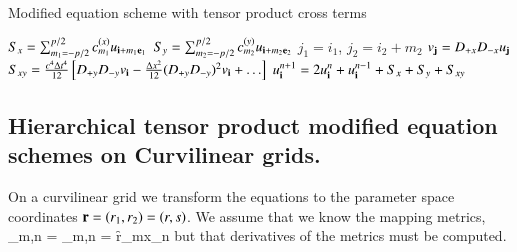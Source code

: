 \begin{algorithm}[H]
\algFontSize 
\caption{Modified equation scheme with tensor product cross terms}
\begin{algorithmic}[1]
        \State $S_x = \sum_{m_1=-p/2}^{p/2} c_{m_1}^{(x)} u_{\mathbf{ i}+m_1\mathbf{ e}_1}$  
        \State $S_y = \sum_{m_2=-p/2}^{p/2} c_{m_2}^{(y)} u_{\mathbf{ i}+m_2\mathbf{ e}_2}$  
          
          \State $j_1=i_1$, $j_2=i_2+m_2$
          \State $v_{\mathbf{ j}} = D_{+x}D_{-x} u_{\mathbf{ j}}$ 
        \EndFor
        \State $S_{xy} = \frac{c^4\Delta t^4}{12} \left[ D_{+y}D_{-y} v_{\mathbf{ i}} -\frac{\Delta x^2}{12} (D_{+y}D_{-y})^2 v_{\mathbf{ i}} + \ldots\right] $   
        \State $\displaystyle u^{n+1}_{\mathbf{ i}} = 2 u^n_{\mathbf{ i}} + u^{n-1}_{\mathbf{ i}} + S_x + S_y + S_{xy}$
      \EndFor   
    \EndFor   
\end{algorithmic} 
\label{alg:ModifiedEquationWithTensorProducts}
\end{algorithm}

\subsection{Hierarchical tensor product modified equation schemes on Curvilinear grids.}


On a curvilinear grid we transform the equations to the parameter space coordinates $\mathbf{ r}=(r_1,r_2)= (r,s)$.
We assume that we know the mapping metrics,
\ba  
  \Big[ \f{\p\rv}{\p \xv}\Big]_{m,n} = \rxv_{m,n} = \f{\p r_m}{\p x_n}
\ea
but that derivatives of the metrics must be computed.

